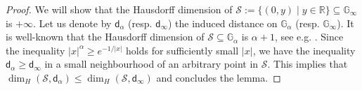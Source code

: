 \documentclass[11pt,twoside,a4paper]{article}
\newcommand{\red}{\color{red}}
\newcommand*\diff{\mathop{}\!\mathrm{d}}
\newcommand{\Leb}{\mathscr{L}}
\newcommand{\R}{\mathbb{R}}
\newcommand{\sfD}{\mathsf D}
\newcommand{\di}
{\mathsf d} %
\newcommand{\e}{{\rm e}}
\newcommand{\G}{\mathbb{G}}
\newcommand{\Scal}{\mathcal{S}}
\theoremstyle{theorem}
\theoremstyle{definition}
\theoremstyle{remark}
\theoremstyle{proof}
\begin{document}
\begin{proof}
We will show that the Hausdorff dimension of $\mathcal{S}:=\{(0,y)\mid y\in\R\}\subseteq \G_\infty$ is $+\infty$. Let us denote by $\di_\alpha$ (resp. $\di_\infty$) the induced distance on $\G_\alpha$ (resp. $\G_\infty$).
It is well-known that the Hausdorff dimension of $\Scal\subseteq \G_\alpha$ is $\alpha+1$, see e.g. \cite{Franchi1983}. Since the inequality $|x|^\alpha\geq e^{-1/|x|}$ holds for sufficiently small $|x|$,
we have the inequality $\di_\alpha\geq \di_\infty$ in a small neighbourhood of an arbitrary point in $\Scal$. This implies that $\dim_H(\Scal,\di_\alpha)\leq \dim_H(\Scal,\di_\infty)$ and concludes the lemma.
\end{proof}
\end{document}
